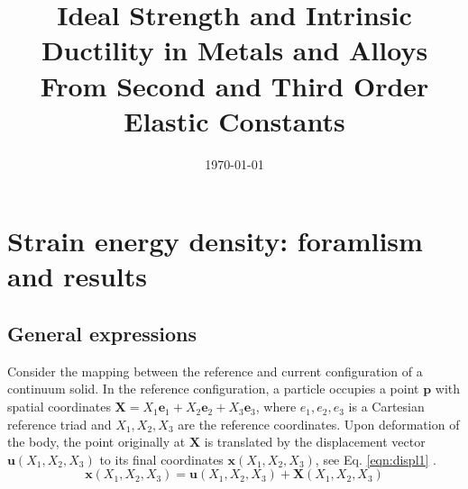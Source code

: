 \documentclass[showpacs,aps,floatfix,prb,reprint,superscriptaddress,onecolumn]{revtex4-1}
\begin{document}
\title{Ideal Strength and Intrinsic Ductility in Metals and Alloys From Second and Third Order Elastic Constants}

%

\date{\today}

\maketitle

\section{Strain energy density: foramlism and results}

\subsection{General expressions}
Consider the mapping between the reference and current configuration of a continuum solid. In the reference configuration, a particle occupies a point $\bm{p}$ with spatial coordinates $\bm{X} = X_{1}\bm{e}_{1} +  X_{2}\bm{e}_{2} + X_{3}\bm{e}_{3}$, where ${e}_{1}, {e}_{2}, {e}_{3}$ is a Cartesian reference triad and $X_{1}, X_{2}, X_{3}$ are the reference coordinates. Upon deformation of the body, the point originally at $\bm{X}$ is translated by the displacement vector $\bm{u} \left(X_{1}, X_{2}, X_{3} \right)$ to its final coordinates $\bm{x} \left(X_{1}, X_{2}, X_{3} \right)$, see Eq. \ref{eqn:displ1} .
\begin{equation}
\label{eqn:displ1} 
\bm{x} \left(X_{1}, X_{2}, X_{3} \right) = \bm{u} \left(X_{1}, X_{2}, X_{3} \right) + \bm{X} \left(X_{1}, X_{2}, X_{3} \right)
\end{equation}
\end{document}
